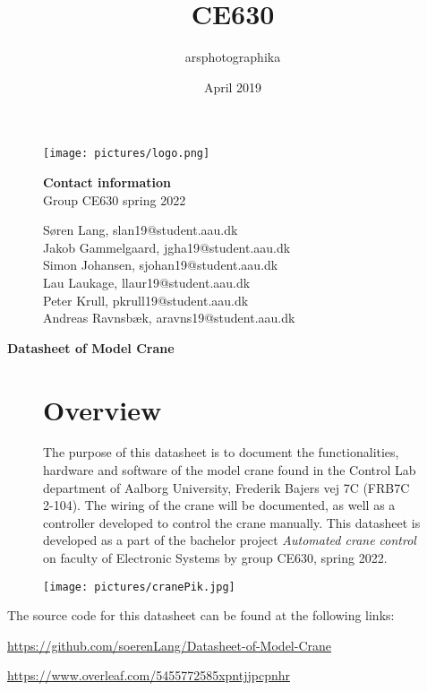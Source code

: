 \documentclass[a4paper,12pt,oneside,pdflatex,italian,final,twocolumn]{article}
\title{CE630}
\author{arsphotographika }
\date{April 2019}
\begin{document}
\pagestyle{fancy}

\chead {\today}


\onecolumn

\begin{figure}[H]
\begin{minipage}{0.47\textwidth}
\centering
\texttt{[image: pictures/logo.png]}

\end{minipage}
\hfill
\begin{minipage}{0.47\textwidth}
\raggedleft
\textbf{Contact information}\\
Group CE630 spring 2022

Søren Lang,
slan19@student.aau.dk\\
Jakob Gammelgaard,
jgha19@student.aau.dk\\
Simon Johansen,
sjohan19@student.aau.dk\\
Lau Laukage,
llaur19@student.aau.dk\\
Peter Krull,
pkrull19@student.aau.dk\\
Andreas Ravnsbæk,
aravns19@student.aau.dk\\

\end{minipage}
\end{figure}

{\huge\textbf{Datasheet of Model Crane}}

\begin{figure}[H]
\begin{minipage}{0.47\textwidth}
\section{Overview}
The purpose of this datasheet is to document the functionalities, hardware and software of the model crane found in the Control Lab department of Aalborg University, Frederik Bajers vej 7C (FRB7C 2-104). The wiring of the crane will be documented, as well as a controller developed to control the crane manually. This datasheet is developed as a part of the bachelor project \textit{Automated crane control} on faculty of Electronic Systems by group CE630, spring 2022. 
\end{minipage}
\hfill
\begin{minipage}{0.47\textwidth}
\centering
\texttt{[image: pictures/cranePik.jpg]}
\end{minipage}
\end{figure}

The source code for this datasheet can be found at the following links:

\url{https://github.com/soerenLang/Datasheet-of-Model-Crane}

\url{https://www.overleaf.com/5455772585xpntjjpcpnhr}








\end{document}
